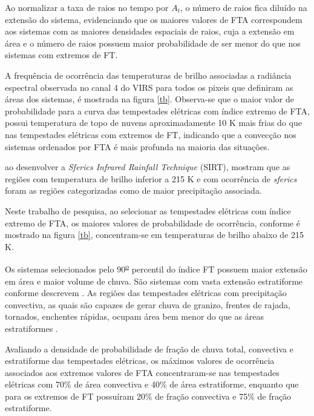 Ao normalizar a taxa de raios no tempo por $A_t$, o número de raios fica diluído na extensão do sistema, evidenciando que os maiores valores de FTA correspondem aos sistemas com as maiores densidades espaciais de raios, cuja a extensão em área e o número de raios possuem maior probabilidade de ser menor do que nos sistemas com extremos de FT.

A frequência de ocorrência das temperaturas de brilho associadas a radiância espectral observada no canal 4 do VIRS para todos os pixeis que definiram as áreas dos sistemas, é mostrada na figura \ref{tb}. Observa-se que o maior valor de probabilidade para a curva das tempestades elétricas com índice extremo de FTA, possui temperatura de topo de nuvens aproximadamente 10 K mais frias do que nas tempestades elétricas com extremos de FT, indicando que a convecção nos sistemas ordenados por FTA é mais profunda na maioria das situações.



 ao desenvolver a \textit{Sferics Infrared Rainfall Technique} (SIRT), mostram que as regiões com temperatura de brilho inferior a 215 K e com ocorrência de \textit{sferics} foram as regiões categorizadas como de maior precipitação associada.

Neste trabalho de pesquisa, ao selecionar as tempestades elétricas com índice extremo de FTA, os maiores valores de probabilidade de ocorrência, conforme é mostrado na figura \ref{tb}, concentram-se em temperaturas de brilho abaixo de 215 K.

Os sistemas selecionados pelo 90\textsuperscript{\underline{o}} percentil do índice FT possuem maior extensão em área e maior volume de chuva. São sistemas com vasta extensão estratiforme conforme descrevem . As regiões das tempestades elétricas com precipitação convectiva, as quais são capazes de gerar chuva de granizo, frentes de rajada, tornados, enchentes rápidas, ocupam área bem menor do que as áreas estratiformes \cite{Jr2007}.

Avaliando a densidade de probabilidade de fração de chuva total, convectiva e estratiforme das tempestades elétricas, os máximos valores de ocorrência associados aos extremos valores de FTA concentraram-se nas tempestades elétricas com 70\% de área convectiva e 40\% de área estratiforme, enquanto que para os extremos de FT possuíram 20\% de fração convectiva e 75\% de fração estratiforme.

